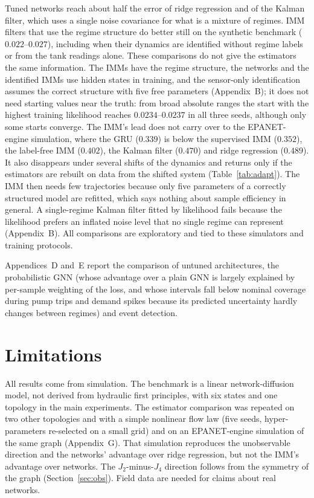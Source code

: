 \documentclass[conference]{IEEEtran}
\begin{document}
Tuned networks reach about half the error of ridge regression and of the Kalman filter, which uses a single noise covariance for what is a mixture of regimes. IMM filters that use the regime structure do better still on the synthetic benchmark ($0.022$--$0.027$), including when their dynamics are identified without regime labels or from the tank readings alone. These comparisons do not give the estimators the same information. The IMMs have the regime structure, the networks and the identified IMMs use hidden states in training, and the sensor-only identification assumes the correct structure with five free parameters (Appendix~B); it does not need starting values near the truth: from broad absolute ranges the start with the highest training likelihood reaches $0.0234$--$0.0237$ in all three seeds, although only some starts converge. The IMM's lead does not carry over to the EPANET-engine simulation, where the GRU ($0.339$) is below the supervised IMM ($0.352$), the label-free IMM ($0.402$), the Kalman filter ($0.470$) and ridge regression ($0.489$). It also disappears under several shifts of the dynamics and returns only if the estimators are rebuilt on data from the shifted system (Table~\ref{tab:adapt}). The IMM then needs few trajectories because only five parameters of a correctly structured model are refitted, which says nothing about sample efficiency in general. A single-regime Kalman filter fitted by likelihood fails because the likelihood prefers an inflated noise level that no single regime can represent (Appendix~B). All comparisons are exploratory and tied to these simulators and training protocols.

Appendices~D and~E report the comparison of untuned architectures, the probabilistic GNN (whose advantage over a plain GNN is largely explained by per-sample weighting of the loss, and whose intervals fall below nominal coverage during pump trips and demand spikes because its predicted uncertainty hardly changes between regimes) and event detection.

\section{Limitations}

All results come from simulation. The benchmark is a linear network-diffusion model, not derived from hydraulic first principles, with six states and one topology in the main experiments. The estimator comparison was repeated on two other topologies and with a simple nonlinear flow law (five seeds, hyper-parameters re-selected on a small grid) and on an EPANET-engine simulation of the same graph (Appendix~G). That simulation reproduces the unobservable direction and the networks' advantage over ridge regression, but not the IMM's advantage over networks. The $J_2$-minus-$J_4$ direction follows from the symmetry of the graph (Section~\ref{sec:obs}). Field data are needed for claims about real networks.
\end{document}

